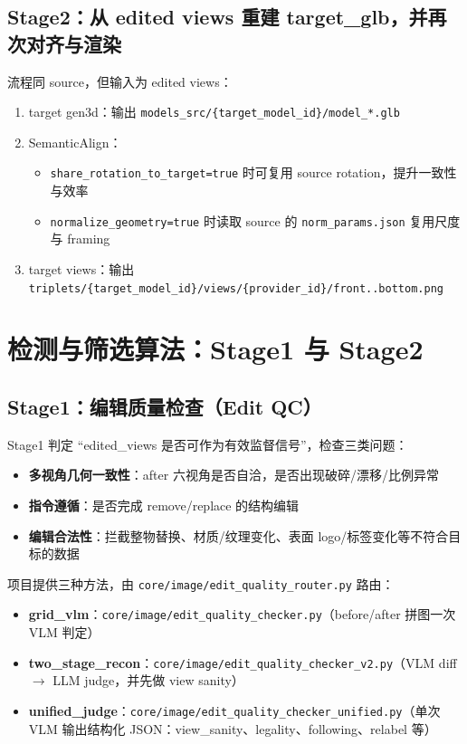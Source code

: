 \documentclass[UTF8,a4paper,11pt]{ctexart}
\begin{document}
\subsection{Stage2：从 edited views 重建 target\_glb，并再次对齐与渲染}
流程同 source，但输入为 edited views：
\begin{enumerate}
  \item target gen3d：输出 \texttt{models\_src/\{target\_model\_id\}/model\_*.glb}
  \item SemanticAlign：
  \begin{itemize}
    \item \texttt{share\_rotation\_to\_target=true} 时可复用 source rotation，提升一致性与效率
    \item \texttt{normalize\_geometry=true} 时读取 source 的 \texttt{norm\_params.json} 复用尺度与 framing
  \end{itemize}
  \item target views：输出 \texttt{triplets/\{target\_model\_id\}/views/\{provider\_id\}/front..bottom.png}
\end{enumerate}

\section{检测与筛选算法：Stage1 与 Stage2}

\subsection{Stage1：编辑质量检查（Edit QC）}
Stage1 判定 ``edited\_views 是否可作为有效监督信号''，检查三类问题：
\begin{itemize}
  \item \textbf{多视角几何一致性}：after 六视角是否自洽，是否出现破碎/漂移/比例异常
  \item \textbf{指令遵循}：是否完成 remove/replace 的结构编辑
  \item \textbf{编辑合法性}：拦截整物替换、材质/纹理变化、表面 logo/标签变化等不符合目标的数据
\end{itemize}

项目提供三种方法，由 \texttt{core/image/edit\_quality\_router.py} 路由：
\begin{itemize}
  \item \textbf{grid\_vlm}：\texttt{core/image/edit\_quality\_checker.py}（before/after 拼图一次 VLM 判定）
  \item \textbf{two\_stage\_recon}：\texttt{core/image/edit\_quality\_checker\_v2.py}（VLM diff $\rightarrow$ LLM judge，并先做 view sanity）
  \item \textbf{unified\_judge}：\texttt{core/image/edit\_quality\_checker\_unified.py}（单次 VLM 输出结构化 JSON：view\_sanity、legality、following、relabel 等）
\end{itemize}
\end{document}
